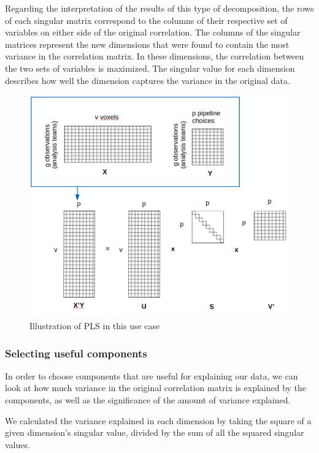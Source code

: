 \documentclass[a4paper,doc,natbib]{apa6}
\begin{document}
Regarding the interpretation of the results of this type of decomposition, the rows of each singular matrix correspond to the columns of their respective set of variables on either side of the original correlation. The columns of the singular matrices represent the new dimensions that were found to contain the most variance in the correlation matrix. In these dimensions, the correlation between the two sets of variables is maximized. The singular value for each dimension describes how well the dimension captures the variance in the original data. 

\begin{figure}[!htb]
    \centering
    \includegraphics[width=\textwidth]{figures/pls_illustration.png}
    \caption{Illustration of PLS in this use case}
    \label{fig:pls_ill}
\end{figure}

\subsubsection{Selecting useful components}

In order to choose components that are useful for explaining our data, we can look at how much variance in the original correlation matrix is explained by the components, as well as the significance of the amount of variance explained. 

We calculated the variance explained in each dimension by taking the square of a given dimension's singular value, divided by the sum of all the squared singular values. 
\end{document}
